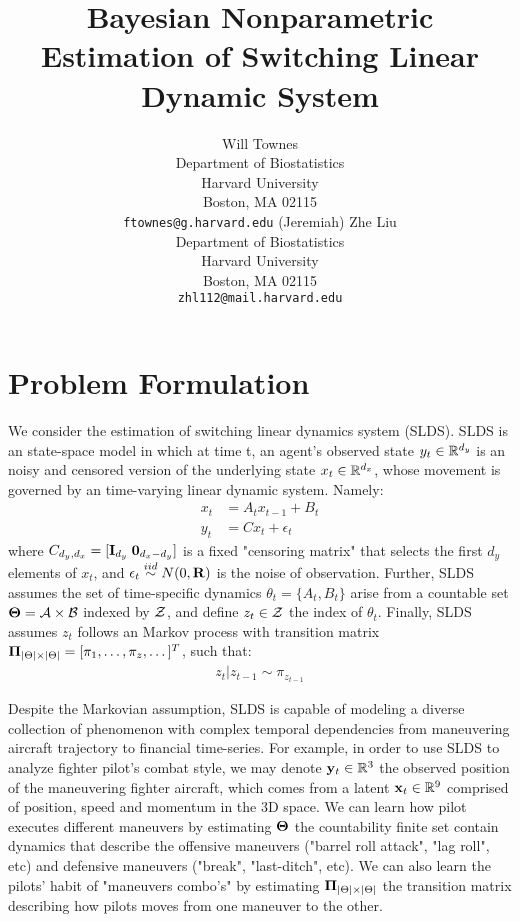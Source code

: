 \documentclass{article} %
\title{Bayesian Nonparametric Estimation of Switching Linear Dynamic System}
\author{
Will Townes \\
Department of Biostatistics\\
Harvard University\\
Boston, MA 02115 \\
\texttt{ftownes@g.harvard.edu} 
\And
(Jeremiah) Zhe Liu \\
Department of Biostatistics\\
Harvard University\\
Boston, MA 02115 \\
\texttt{zhl112@mail.harvard.edu} 
}
\begin{document}
\maketitle
\vspace*{-4em}
\tableofcontents
\thispagestyle{empty}
\newpage
\setcounter{page}{1}




\section{Problem Formulation}

We consider the estimation of switching linear dynamics system (SLDS). SLDS is an state-space model in which at time t, an agent's observed state $y_t \in {\mathbb R}^{d_y}$ is an noisy and censored version of the underlying state $x_t \in {\mathbb R}^{d_x}$, whose movement is governed by an time-varying linear dynamic system. Namely:
\begin{align*}
x_t &= A_t x_{t-1} + B_t \\
y_t &= C x_t + \epsilon_t
\end{align*}
where $C_{d_y, d_x} = [{\bf I}_{d_y} \; {\bf 0}_{d_x - d_y} ]$ is a fixed "censoring matrix" that selects the first $d_y$ elements of $x_t$, and $\epsilon_t \stackrel{iid}{\sim} N(0, {\bf R})$ is the noise of observation. Further, SLDS assumes the set of time-specific dynamics $\theta_t = \{A_t, B_t\}$ arise from a countable set $\boldsymbol{\Theta} = {\cal A} \times {\cal B}$ indexed by ${\cal Z}$, and define $z_t \in {\cal Z}$ the index of $\theta_t$. Finally, SLDS assumes $z_t$ follows an Markov process with transition matrix $\boldsymbol{\Pi}_{|\Theta| \times |\Theta|} = [\pi_1, \dots, \pi_z, \dots]^T$, such that:
\begin{align*}
z_t | z_{t-1} \sim \pi_{z_{t-1}}
\end{align*}

Despite the Markovian assumption, SLDS is capable of modeling a diverse collection of phenomenon with complex temporal dependencies from maneuvering aircraft trajectory to financial time-series. For example, in order to use SLDS to analyze fighter pilot's combat style, we may denote ${\bf y}_t \in {\mathbb R}^3$ the observed position of the maneuvering fighter aircraft, which comes  from a latent ${\bf x}_t \in {\mathbb R}^9$ comprised of position, speed and momentum in the 3D space. We can learn how pilot executes different maneuvers by estimating $\boldsymbol{\Theta}$ the countability finite set contain dynamics that describe the offensive maneuvers ("barrel roll attack", "lag roll", etc) and defensive maneuvers ("break", "last-ditch", etc). We can also learn the pilots' habit of "maneuvers combo's" by estimating $\boldsymbol{\Pi}_{|\Theta| \times |\Theta|}$ the transition matrix describing how pilots moves from one maneuver to the other.
\end{document}
